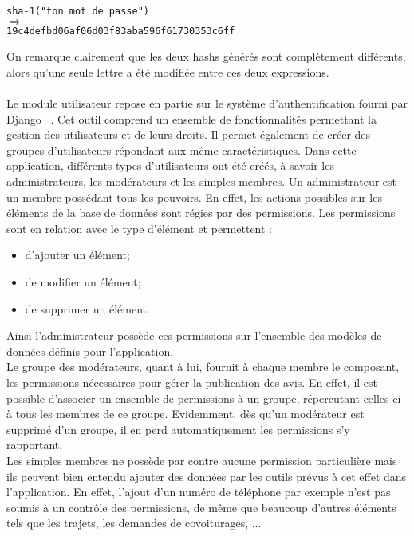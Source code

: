 \documentclass[12pt, a4paper, oneside]{article}
\begin{document}
    \begin{center}
        \verb?sha-1("ton mot de passe")?\\
        $\Longrightarrow$\\
        \verb?19c4defbd06af06d03f83aba596f61730353c6ff?
    \end{center}
        On remarque clairement que les deux hashs générés sont complètement différents, alors qu'une seule lettre a été modifiée entre ces deux expressions.\\\\
    \indent Le module utilisateur repose en partie sur le système d'authentification fourni par Django ~\cite{django-auth}. Cet outil comprend un ensemble de fonctionnalités permettant la gestion des utilisateurs et de leurs droits. Il permet également de créer des groupes d'utilisateurs répondant aux même caractéristiques. Dans cette application, différents types d'utilisateurs ont été créés, à savoir les administrateurs, les modérateurs et les simples membres. Un administrateur est un membre possédant tous les pouvoirs. En effet, les actions possibles sur les éléments de la base de données sont régies par des permissions. Les permissions sont en relation avec le type d'élément et permettent :\\
    \begin{itemize}
        \item d'ajouter un élément;
        \item de modifier un élément;
        \item de supprimer un élément.\\
    \end{itemize}
    Ainsi l'administrateur possède ces permissions sur l'ensemble des modèles de données définis pour l'application. \\
    Le groupe des modérateurs, quant à lui, fournit à chaque membre le composant, les permissions nécessaires pour gérer la publication des avis. En effet, il est possible d'associer un ensemble de permissions à un groupe, répercutant celles-ci à tous les membres de ce groupe. Evidemment, dès qu'un modérateur est supprimé d'un groupe, il en perd automatiquement les permissions s'y rapportant.\\
    Les simples membres ne possède par contre aucune permission particulière mais ils peuvent bien entendu ajouter des données par les outils prévus à cet effet dans l'application. En effet, l'ajout d'un numéro de téléphone par exemple n'est pas soumis à un contrôle des permissions, de même que beaucoup d'autres éléments tels que les trajets, les demandes de covoiturages, ...\\\\
\end{document}
